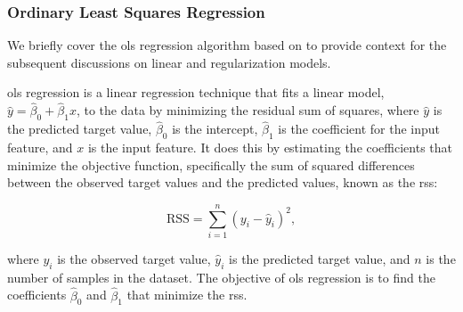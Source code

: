\subsubsection{Ordinary Least Squares Regression}\label{sec:ols}
We briefly cover the \gls{ols} regression algorithm based on \citet{James2023AnIS} to provide context for the subsequent discussions on linear and regularization models.

\gls{ols} regression is a linear regression technique that fits a linear model, $\hat{y} = \hat{\beta}_0 + \hat{\beta}_1 x$, to the data by minimizing the residual sum of squares, where $\hat{y}$ is the predicted target value, $\hat{\beta}_0$ is the intercept, $\hat{\beta}_1$ is the coefficient for the input feature, and $x$ is the input feature.
It does this by estimating the coefficients that minimize the objective function, specifically the sum of squared differences between the observed target values and the predicted values, known as the \gls{rss}:

$$
\text{RSS} = \sum_{i=1}^{n} (y_i - \hat{y}_i)^2,
$$

where $y_i$ is the observed target value, $\hat{y}_i$ is the predicted target value, and $n$ is the number of samples in the dataset.
The objective of \gls{ols} regression is to find the coefficients $\hat{\beta}_0$ and $\hat{\beta}_1$ that minimize the \gls{rss}.